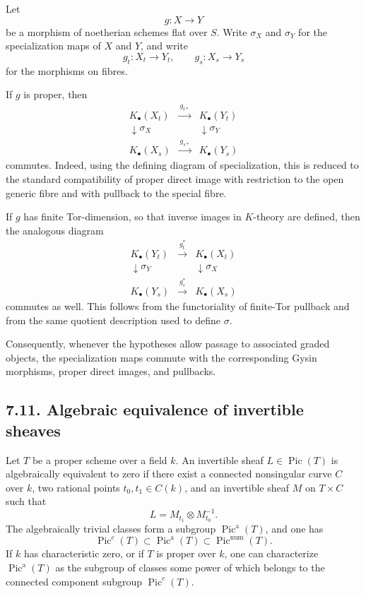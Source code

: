 \documentclass[12pt]{article}
\newcommand{\Pic}{\operatorname{Pic}}
\newcommand{\xto}[1]{\xrightarrow{#1}}
\newcommand{\longto}{\longrightarrow}
\begin{document}
Let
\[
g:X\longto Y
\]
be a morphism of noetherian schemes flat over $S$. Write $\sigma_X$ and $\sigma_Y$ for the specialization maps of $X$ and $Y$, and write
\[
g_t:X_t\to Y_t,
\qquad
 g_s:X_s\to Y_s
\]
for the morphisms on fibres.

If $g$ is proper, then
\[
\begin{array}{ccc}
K_\bullet(X_t)&\xto{\,g_{t*}\,}&K_\bullet(Y_t)\\
\downarrow\scriptstyle\sigma_X&&\downarrow\scriptstyle\sigma_Y\\
K_\bullet(X_s)&\xto{\,g_{s*}\,}&K_\bullet(Y_s)
\end{array}
\]
commutes. Indeed, using the defining diagram of specialization, this is reduced to the standard compatibility of proper direct image with restriction to the open generic fibre and with pullback to the special fibre.

If $g$ has finite Tor-dimension, so that inverse images in $K$-theory are defined, then the analogous diagram
\[
\begin{array}{ccc}
K_\bullet(Y_t)&\xto{\,g_t^*\,}&K_\bullet(X_t)\\
\downarrow\scriptstyle\sigma_Y&&\downarrow\scriptstyle\sigma_X\\
K_\bullet(Y_s)&\xto{\,g_s^*\,}&K_\bullet(X_s)
\end{array}
\]
commutes as well. This follows from the functoriality of finite-Tor pullback and from the same quotient description used to define $\sigma$.

Consequently, whenever the hypotheses allow passage to associated graded objects, the specialization maps commute with the corresponding Gysin morphisms, proper direct images, and pullbacks.

\subsection*{7.11. Algebraic equivalence of invertible sheaves}

Let $T$ be a proper scheme over a field $k$. An invertible sheaf $L\in\Pic(T)$ is algebraically equivalent to zero if there exist a connected nonsingular curve $C$ over $k$, two rational points $t_0,t_1\in C(k)$, and an invertible sheaf $M$ on $T\times C$ such that
\[
L=M_{t_1}\otimes M_{t_0}^{-1}.
\]
The algebraically trivial classes form a subgroup $\Pic^{\mathrm a}(T)$, and one has
\[
\Pic^c(T)\subset \Pic^{\mathrm a}(T)\subset\Pic^{\mathrm{num}}(T).
\]
If $k$ has characteristic zero, or if $T$ is proper over $k$, one can characterize $\Pic^{\mathrm a}(T)$ as the subgroup of classes some power of which belongs to the connected component subgroup $\Pic^c(T)$.
\end{document}
